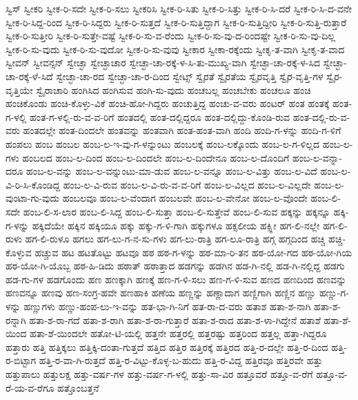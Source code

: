 {ಸ್ವಿಸ್
ಸ್ವೀಕರಿ
ಸ್ವೀಕ-ರಿ-ಸದೇ
ಸ್ವೀಕ-ರಿ-ಸಲು
ಸ್ವೀಕರಿಸಿ
ಸ್ವೀಕ-ರಿ-ಸಿತು
ಸ್ವೀಕ-ರಿ-ಸಿತ್ತು
ಸ್ವೀಕ-ರಿ-ಸಿ-ದರೆ
ಸ್ವೀಕ-ರಿ-ಸಿ-ದ-ವನೇ
ಸ್ವೀಕ-ರಿ-ಸಿದ್ದ-ರಿಂದ
ಸ್ವೀಕ-ರಿ-ಸಿದ್ದರು
ಸ್ವೀಕ-ರಿ-ಸುತ್ತದೆ
ಸ್ವೀಕ-ರಿ-ಸುತ್ತಿದ್ದಾಗ
ಸ್ವೀಕ-ರಿ-ಸುತ್ತಿದ್ದೀರಿ
ಸ್ವೀಕ-ರಿ-ಸುತ್ತಿ-ರುತ್ತಾರೆ
ಸ್ವೀಕ-ರಿ-ಸುತ್ತೀರಿ
ಸ್ವೀಕ-ರಿ-ಸುತ್ತೇ-ವಷ್ಟೆ
ಸ್ವೀಕ-ರಿ-ಸು-ವ-ರೆಂದು
ಸ್ವೀಕ-ರಿ-ಸು-ವು-ದ-ರಿಂದಷ್ಟೇ
ಸ್ವೀಕ-ರಿ-ಸು-ವು-ದಿಲ್ಲ
ಸ್ವೀಕ-ರಿ-ಸು-ವುದು
ಸ್ವೀಕ-ರಿ-ಸು-ವುದೋ
ಸ್ವೀಕ-ರಿ-ಸು-ವುವು
ಸ್ವೀಕಾರ
ಸ್ವೀಕಾ-ರಕ್ಕೆಂದು
ಸ್ವೀಕೃ-ತ-ವಾಗಿ
ಸ್ವೀಕೃ-ತ-ವಾದ
ಸ್ವೀವನ್
ಸ್ವೀವನ್ಸನ್
ಸ್ವೇಚ್ಛಾ
ಸ್ವೇಚ್ಛಾಚಾರ
ಸ್ವೇಚ್ಛಾ-ಚಾ-ರಕ್ಕೆ-ಳ-ಸಿ-ತು-ಮುಖ್ಯ-ವಾಗಿ
ಸ್ವೇಚ್ಛಾ-ಚಾ-ರಕ್ಕೆ-ಳ-ಸಿದ
ಸ್ವೇಚ್ಛಾ-ಚಾ-ರಕ್ಕೆ-ಳೆ-ಸಿದೆ
ಸ್ವೇಚ್ಛಾ-ಚಾ-ರದ
ಸ್ವೇಚ್ಛಾ-ಚಾ-ರ-ದಿಂದ
ಸ್ವೇಟ್ಸ್
ಸ್ವೈರತೆ
ಸ್ವೈರತೆಯ
ಸ್ವೈರವೃತ್ತಿ
ಸ್ವೈರ-ವೃತ್ತಿ-ಗಳ
ಸ್ವೈರ-ವೃತ್ತಿಯೇ
ಸ್ವೈರಾಚಾರಿ
ಹಂಗಿಸಿದ
ಹಂಗಿಸುವ
ಹಂಗಿ-ಸು-ವುದು
ಹಂಚಬಲ್ಲ
ಹಂಚಬೇಕು
ಹಂಚಲೂ
ಹಂಚಿ
ಹಂಚಿಕೊಂಡು
ಹಂಚಿ-ಕೊಳ್ಳು-ವಿಕೆ
ಹಂಚಿ-ಹೋ-ಗಿದ್ದರು
ಹಂಚುತ್ತಿದ್ದ
ಹಂಚು-ವ-ವರು
ಹಂಟರ್
ಹಂತ
ಹಂತಕ್ಕೆ
ಹಂತ-ಗ-ಳಲ್ಲಿ
ಹಂತ-ಗ-ಳಲ್ಲಿ-ರು-ವ-ವ-ರಿಗೆ
ಹಂತದಲ್ಲಿ
ಹಂತ-ದಲ್ಲಿದ್ದರೂ
ಹಂತ-ದಲ್ಲಿದ್ದು-ಕೊಂಡಿ-ರುವ
ಹಂತ-ದಲ್ಲಿ-ರು-ವ-ವರು
ಹಂತದಲ್ಲೇ
ಹಂತ-ದಿಂದಲೇ
ಹಂತವನ್ನು
ಹಂತವಾಗಿ
ಹಂತ-ಹಂತ-ವಾಗಿ
ಹಂದಿ
ಹಂದಿ-ಗ-ಳನ್ನು
ಹಂದಿ-ಗ-ಳಿಗೆ
ಹಂಪಲು
ಹಂಬ
ಹಂಬಲ
ಹಂಬ-ಲ-ಇ-ವು-ಗ-ಳನ್ನುಂಟು
ಹಂಬಲಕ್ಕೆ
ಹಂಬ-ಲಕ್ಕೊಂದು
ಹಂಬ-ಲ-ಗ-ಳಿಲ್ಲದ
ಹಂಬ-ಲ-ಗಳು
ಹಂಬಲದ
ಹಂಬ-ಲ-ದಿಂದ
ಹಂಬ-ಲ-ದಿಂದಲೇ
ಹಂಬ-ಲ-ದಿಂದೇನೂ
ಹಂಬ-ಲ-ದೊಂದಿಗೆ
ಹಂಬ-ಲ-ವನ್ನಾ-ದರೂ
ಹಂಬ-ಲ-ವನ್ನು
ಹಂಬ-ಲ-ವನ್ನುಂಟು-ಮಾ-ಡುವ
ಹಂಬ-ಲ-ವನ್ನೂ
ಹಂಬ-ಲ-ವಿತ್ತು
ಹಂಬ-ಲ-ವಿದೆ
ಹಂಬ-ಲ-ವಿ-ರಿ-ಸಿ-ಕೊಂಡಿದ್ದ
ಹಂಬ-ಲ-ವಿ-ರುವ
ಹಂಬ-ಲ-ವಿ-ರು-ವ-ವ-ರಿಗೆ
ಹಂಬ-ಲ-ವಿಲ್ಲದ
ಹಂಬ-ಲ-ವಿಲ್ಲದೇ
ಹಂಬ-ಲ-ವುಂಟಾ-ಗು-ವುದು
ಹಂಬಲವೂ
ಹಂಬ-ಲ-ವೆಂದಾಗ
ಹಂಬಲವೇ
ಹಂಬ-ಲ-ವೇನೋ
ಹಂಬ-ಲ-ವೊಂದೇ
ಹಂಬ-ಲಿ-ಸದೇ
ಹಂಬ-ಲಿ-ಸ-ಲಾರ
ಹಂಬ-ಲಿ-ಸಿದ್ದ
ಹಂಬ-ಲಿ-ಸುತ್ತಾ
ಹಂಬ-ಲಿ-ಸುತ್ತೇವೆ
ಹಂಬ-ಲಿ-ಸುವ
ಹಕ್ಕನ್ನು
ಹಕ್ಕನ್ನೂ
ಹಕ್ಕಿ-ಗ-ಳನ್ನು
ಹಕ್ಕಿದೆಯೇ
ಹಕ್ಕಿನ
ಹಕ್ಕಿಯೂ
ಹಕ್ಕು
ಹಕ್ಕು-ಗ-ಳಿ-ಗಾಗಿ
ಹಕ್ಕುಗಳೂ
ಹಕ್ಸಲೀಯ
ಹಕ್ಸ್ಲೀ
ಹಗ-ಲಿ-ನಲ್ಲೇ
ಹಗ-ಲಿ-ರುಳು
ಹಗ-ಲಿ-ರುಳೂ
ಹಗಲು
ಹಗ-ಲು-ಗ-ನ-ಸು-ಗಳು
ಹಗ-ಲು-ರಾತ್ರಿ
ಹಗ-ಲೂ-ರಾತ್ರಿ
ಹಗ್ಗ
ಹಗ್ಗದಿಂದ
ಹಚ್ಚಿ
ಹಚ್ಚಿ-ಕೊಳ್ಳುವ
ಹಚ್ಚುವ
ಹಟ
ಹಟತೊಟ್ಟು
ಹಟವೂ
ಹಠ
ಹಠ-ಗ-ಳನ್ನು
ಹಠ-ಮಾ-ರಿ-ತನ
ಹಠ-ಯೋ-ಗದ
ಹಠ-ಯೋ-ಗಿಯ
ಹಠ-ಯೋ-ಗಿ-ಯೊಬ್ಬ
ಹಠ-ಹಿ-ಡಿದು
ಹಠಾತ್
ಹಠಾತ್ತಾದ
ಹಡಗನ್ನು
ಹಡಗಿನ
ಹಡ-ಗಿ-ನಲ್ಲಿ
ಹಡ-ಗಿ-ನಲ್ಲಿದ್ದ
ಹಡಗು
ಹಡ-ಗು-ಗಳ
ಹಡಗೊಂದು
ಹಣ
ಹಣಕ್ಕಾಗಿ
ಹಣಕ್ಕೆ
ಹಣ-ಗ-ಳಿ-ಸಲು
ಹಣ-ಗ-ಳಿ-ಸುವ
ಹಣದ
ಹಣದಿಂದ
ಹಣವನ್ನು
ಹಣವನ್ನೂ
ಹಣವು
ಹಣ-ಸಂಗ್ರ-ಹವೇ
ಹಣಹಾಕಿ
ಹಣೆಯ
ಹಣ್ಣನ್ನು
ಹಣ್ಣಾದಾಗ
ಹಣ್ಣಿಗಾಗಿ
ಹಣ್ಣಿನ
ಹಣ್ಣು
ಹಣ್ಣು-ಗ-ಳನ್ನು
ಹಣ್ಣುಗಳು
ಹಣ್ಣು-ಹಂಪ-ಲು-ಇ-ವನ್ನು
ಹತ-ಭಾ-ಗಿ-ನಿಗೆ
ಹತ-ರಾ-ದ-ವರು
ಹತಾಶ
ಹತಾ-ಶ-ನಾಗಿ
ಹತಾ-ಶ-ರನ್ನಾಗಿ
ಹತಾ-ಶ-ರಾ-ಗದೆ
ಹತಾ-ಶ-ರಾಗಿ
ಹತಾ-ಶ-ರಾ-ಗುತ್ತಾರೆ
ಹತಾ-ಶ-ರಾದ
ಹತಾ-ಶ-ಳಾ-ಗಿದ್ದೇನೆ
ಹತಾಶೆ
ಹತಾ-ಶೆ-ಯಿಂದ
ಹತಾ-ಶೆ-ಯಿಂದಲೇ
ಹತೋ-ಟಿ-ಯಲ್ಲಿ
ಹತ್ತನೇ
ಹತ್ತರಲ್ಲಿ
ಹತ್ತರಷ್ಟು
ಹತ್ತರಿಂದ
ಹತ್ತಲ್ಲ
ಹತ್ತಾ-ಗಿದ್ದರೂ
ಹತ್ತಾರು
ಹತ್ತಿ
ಹತ್ತಿಕ್ಕಲು
ಹತ್ತಿಕ್ಕಿ-ದಂತಾ-ಗುತ್ತದೆ
ಹತ್ತಿದ
ಹತ್ತಿರ
ಹತ್ತಿರಕ್ಕೆ
ಹತ್ತಿರದ
ಹತ್ತಿ-ರ-ದಲ್ಲೇ
ಹತ್ತಿ-ರ-ದಿಂದ
ಹತ್ತಿ-ರ-ಬಿಟ್ಟಾಗ
ಹತ್ತಿ-ರ-ವಾ-ಗಿ-ರುತ್ತದೆ
ಹತ್ತಿ-ರ-ವಿಟ್ಟು-ಕೊಳ್ಳ-ಬ-ಹುದು
ಹತ್ತಿ-ರ-ವಿದ್ದ
ಹತ್ತಿರವೂ
ಹತ್ತಿರವೇ
ಹತ್ತು
ಹತ್ತುಪಾಲು
ಹತ್ತುಲಕ್ಷ
ಹತ್ತು-ವರ್ಷ-ಗಳ
ಹತ್ತು-ವರ್ಷ-ಗ-ಳಲ್ಲಿ
ಹತ್ತು-ಸಾ-ವಿರ
ಹತ್ತೂವರೆ
ಹತ್ತೂ-ವ-ರೆಗೆ
ಹತ್ತೂ-ವ-ರೆ-ಯ-ವ-ರೆಗೂ
ಹತ್ತೊಂಬತ್ತನೆ
}
